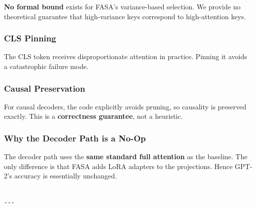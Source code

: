 \textbf{No formal bound} exists for FASA's variance-based selection. We provide 
no theoretical guarantee that high-variance keys correspond to high-attention 
keys.

\subsubsection{CLS Pinning}

The CLS token receives disproportionate attention in practice. Pinning it 
avoids a catastrophic failure mode.

\subsubsection{Causal Preservation}

For causal decoders, the code explicitly avoids pruning, so causality is 
preserved exactly. This is a \textbf{correctness guarantee}, not a heuristic.

\subsubsection{Why the Decoder Path is a No-Op}

The decoder path uses the \textbf{same standard full attention} as the baseline. 
The only difference is that FASA adds LoRA adapters to the projections. 
Hence GPT-2's accuracy is essentially unchanged.
\begin{lstlisting}

---
\end{lstlisting}